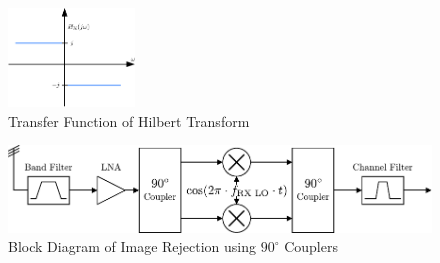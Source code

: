 \begin{figure}[h!]
  \centering
  \includegraphics[width=0.3\textwidth]{figures/hilbert}
  \caption{Transfer Function of Hilbert Transform}
  \label{fig:hilbert}
\end{figure}

\begin{figure}[p]
  \centering
  \includegraphics[width=\textwidth]{figures/rx_rf_1_bd}
  \caption{Block Diagram of Image Rejection using $90^\circ$ Couplers}
  \label{fig:rx_rf_1_bd}
\end{figure}

